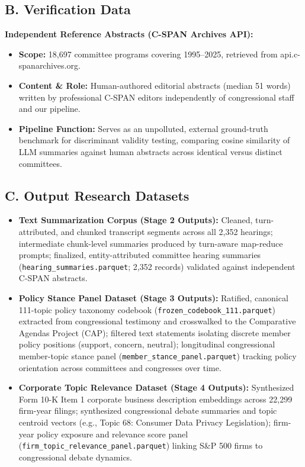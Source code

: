 \documentclass[11pt]{article}
\begin{document}
\subsection*{B. Verification Data}

\textbf{Independent Reference Abstracts (C-SPAN Archives API):}
\begin{itemize}
    \item \textbf{Scope:} 18,697 committee programs covering 1995--2025, retrieved from api.c-spanarchives.org.
    \item \textbf{Content \& Role:} Human-authored editorial abstracts (median 51 words) written by professional C-SPAN editors independently of congressional staff and our pipeline.
    \item \textbf{Pipeline Function:} Serves as an unpolluted, external ground-truth benchmark for discriminant validity testing, comparing cosine similarity of LLM summaries against human abstracts across identical versus distinct committees.
\end{itemize}

\subsection*{C. Output Research Datasets}

\begin{itemize}
    \item \textbf{Text Summarization Corpus (Stage 2 Outputs):} Cleaned, turn-attributed, and chunked transcript segments across all 2,352 hearings; intermediate chunk-level summaries produced by turn-aware map-reduce prompts; finalized, entity-attributed committee hearing summaries (\texttt{hearing\_summaries.parquet}; 2,352 records) validated against independent C-SPAN abstracts.
    \item \textbf{Policy Stance Panel Dataset (Stage 3 Outputs):} Ratified, canonical 111-topic policy taxonomy codebook (\texttt{frozen\_codebook\_111.parquet}) extracted from congressional testimony and crosswalked to the Comparative Agendas Project (CAP); filtered text statements isolating discrete member policy positions (support, concern, neutral); longitudinal congressional member-topic stance panel (\texttt{member\_stance\_panel.parquet}) tracking policy orientation across committees and congresses over time.
    \item \textbf{Corporate Topic Relevance Dataset (Stage 4 Outputs):} Synthesized Form 10-K Item 1 corporate business description embeddings across 22,299 firm-year filings; synthesized congressional debate summaries and topic centroid vectors (e.g., Topic 68: Consumer Data Privacy Legislation); firm-year policy exposure and relevance score panel (\texttt{firm\_topic\_relevance\_panel.parquet}) linking S\&P 500 firms to congressional debate dynamics.
\end{itemize}
\end{document}
